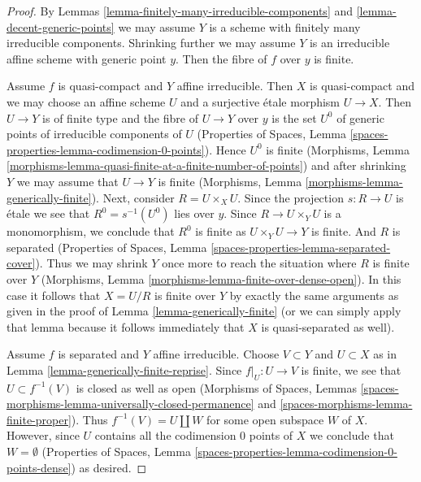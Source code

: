 \begin{proof}
By Lemmas \ref{lemma-finitely-many-irreducible-components} and
\ref{lemma-decent-generic-points} we may assume $Y$ is a scheme
with finitely many irreducible components. Shrinking further we
may assume $Y$ is an irreducible affine scheme with generic point $y$.
Then the fibre of $f$ over $y$ is finite.

\medskip\noindent
Assume $f$ is quasi-compact and $Y$ affine irreducible. Then $X$ is
quasi-compact and we may choose an affine scheme $U$ and a
surjective \'etale morphism $U \to X$. Then $U \to Y$ is of finite type
and the fibre of $U \to Y$ over $y$ is the set $U^0$ of generic points of
irreducible components of $U$ (Properties of Spaces, Lemma
\ref{spaces-properties-lemma-codimension-0-points}).
Hence $U^0$ is finite
(Morphisms, Lemma
\ref{morphisms-lemma-quasi-finite-at-a-finite-number-of-points})
and after shrinking $Y$ we may assume that $U \to Y$ is finite
(Morphisms, Lemma \ref{morphisms-lemma-generically-finite}).
Next, consider $R = U \times_X U$. Since the projection
$s : R \to U$ is \'etale we see that $R^0 = s^{-1}(U^0)$
lies over $y$. Since $R \to U \times_Y U$ is a monomorphism,
we conclude that $R^0$ is finite as $U \times_Y U \to Y$ is finite.
And $R$ is separated
(Properties of Spaces, Lemma \ref{spaces-properties-lemma-separated-cover}).
Thus we may shrink $Y$ once more to reach the situation
where $R$ is finite over $Y$
(Morphisms, Lemma \ref{morphisms-lemma-finite-over-dense-open}).
In this case it follows that $X = U/R$ is finite over $Y$
by exactly the same arguments as given in the proof of
Lemma \ref{lemma-generically-finite}
(or we can simply apply that lemma because
it follows immediately that $X$ is quasi-separated as well).

\medskip\noindent
Assume $f$ is separated and $Y$ affine irreducible. Choose $V \subset Y$
and $U \subset X$ as in Lemma \ref{lemma-generically-finite-reprise}.
Since $f|_U : U \to V$ is finite, we see that $U \subset f^{-1}(V)$
is closed as well as open
(Morphisms of Spaces, Lemmas
\ref{spaces-morphisms-lemma-universally-closed-permanence} and
\ref{spaces-morphisms-lemma-finite-proper}).
Thus $f^{-1}(V) = U \amalg W$ for some
open subspace $W$ of $X$. However, since $U$ contains all the codimension
$0$ points of $X$ we conclude that $W = \emptyset$
(Properties of Spaces, Lemma
\ref{spaces-properties-lemma-codimension-0-points-dense})
as desired.
\end{proof}






